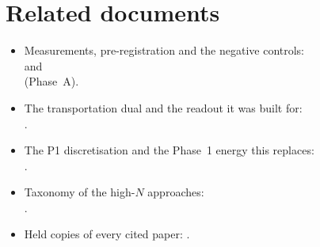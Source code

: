 \documentclass[11pt,a4paper]{article}
\begin{document}
\section*{Related documents}
\begin{itemize}[itemsep=1pt]
  \item Measurements, pre-registration and the negative controls:\\
     and\\
     (Phase~A).
  \item The transportation dual and the readout it was built for:\\
    .
  \item The P1 discretisation and the Phase~1 energy this replaces:\\
    .
  \item Taxonomy of the high-$N$ approaches:\\
    .
  \item Held copies of every cited paper: .
\end{itemize}



\end{document}
